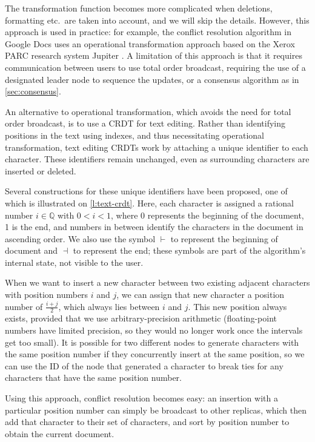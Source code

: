 The transformation function becomes more complicated when deletions, formatting etc.\ are taken into account, and we will skip the details.
However, this approach is used in practice: for example, the conflict resolution algorithm in Google Docs uses an operational transformation approach based on the Xerox PARC research system Jupiter \citep{Nichols:1995}.
A limitation of this approach is that it requires communication between users to use total order broadcast, requiring the use of a designated leader node to sequence the updates, or a consensus algorithm as in \autoref{sec:consensus}.

An alternative to operational transformation, which avoids the need for total order broadcast, is to use a CRDT for text editing.
Rather than identifying positions in the text using indexes, and thus necessitating operational transformation, text editing CRDTs work by attaching a unique identifier to each character.
These identifiers remain unchanged, even as surrounding characters are inserted or deleted.

Several constructions for these unique identifiers have been proposed, one of which is illustrated on \autoref{l:text-crdt}.
Here, each character is assigned a rational number $i \in \mathbb{Q}$ with $0 < i < 1$, where 0 represents the beginning of the document, 1 is the end, and numbers in between identify the characters in the document in ascending order.
We also use the symbol $\vdash$ to represent the beginning of document and $\dashv$ to represent the end; these symbols are part of the algorithm's internal state, not visible to the user.

When we want to insert a new character between two existing adjacent characters with position numbers $i$ and $j$, we can assign that new character a position number of $\frac{i+j}{2}$, which always lies between $i$ and $j$.
This new position always exists, provided that we use arbitrary-precision arithmetic (floating-point numbers have limited precision, so they would no longer work once the intervals get too small).
It is possible for two different nodes to generate characters with the same position number if they concurrently insert at the same position, so we can use the ID of the node that generated a character to break ties for any characters that have the same position number.

Using this approach, conflict resolution becomes easy: an insertion with a particular position number can simply be broadcast to other replicas, which then add that character to their set of characters, and sort by position number to obtain the current document.

